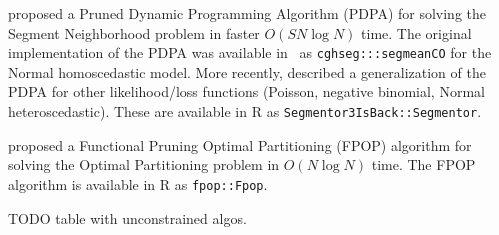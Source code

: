 \documentclass[article]{jss}
\newcommand{\R}{\proglang{R}}
\begin{document}
\citet{pruned-dp} proposed a Pruned Dynamic Programming Algorithm
(PDPA) for solving the Segment Neighborhood problem in faster
$O(S N\log N)$ time. The original implementation of the PDPA was
available in \R\ as \verb|cghseg:::segmeanCO| for the Normal
homoscedastic model. More recently, \citet{cleynen2013segmentation}
described a generalization of the PDPA for other likelihood/loss
functions (Poisson, negative binomial, Normal heteroscedastic). These
are available in R as \verb|Segmentor3IsBack::Segmentor|.

\citet{fpop} proposed a Functional Pruning Optimal Partitioning (FPOP)
algorithm for solving the Optimal Partitioning problem in $O(N\log N)$
time. The FPOP algorithm is available in R as \verb|fpop::Fpop|.

TODO table with unconstrained algos.

\end{document}
